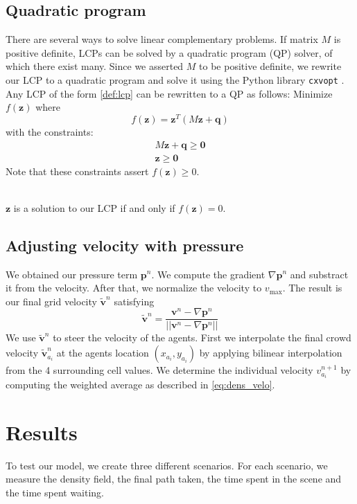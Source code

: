 \documentclass{article}
\let\oldtil\tilde
\renewcommand{\vec}[1]{\mathbf{#1}}
\renewcommand{\tilde}[1]{\oldtil{\mathbf{#1}}}
\begin{document}
\subsection{Quadratic program}
There are several ways to solve linear complementary problems. If  matrix $M$ is positive definite, LCPs can be solved by a quadratic program (QP) solver, of which there exist many. Since we asserted $M$ to be positive definite, we rewrite our LCP to a quadratic program and solve it using the Python library \texttt{cxvopt} \cite{cvxopt}.
\ \\
Any LCP of the form \eqref{def:lcp} can be rewritten to a QP as follows: Minimize $f(\vec{z})$ where
\begin{equation}
	f(\vec{z}) = \vec{z}^T\left( M\vec{z}+\vec{q} \right)
\end{equation}
with the constraints:
\begin{align}
	M\vec{z} + \vec{q}\geq\vec{0}\\
	\vec{z}\geq\vec{0}
\end{align}
Note that these constraints assert $f(\vec{z}) \geq 0$. 

\ \\
$\vec{z}$ is a solution to our LCP if and only if $f(\vec{z})=0$. 
\subsection{Adjusting velocity with pressure}
We obtained our pressure term $\vec{p}^n$. We compute the gradient $\nabla\vec{p}^n$ and substract it from the velocity. After that, we normalize the velocity to $v_{\max}$.
The result is our final grid velocity $\tilde{v}^n$ satisfying
\begin{equation}
	\tilde{v}^n = \frac{\vec{v}^n-\nabla\vec{p}^n}{||\vec{v}^n-\nabla\vec{p}^n||}
	\label{eq:finvelocity}
\end{equation}
We use $\tilde{v}^n$ to steer the velocity of the agents. First we interpolate the final crowd velocity $\tilde{v}^n_{a_i}$ at the agents location $(x_{a_i},y_{a_i})$ by applying bilinear interpolation from the 4 surrounding cell values. We determine the individual velocity $v^{n+1}_{a_i}$ by computing the weighted average as described in \eqref{eq:dens_velo}.
\newpage
\section{Results}
To test our model, we create three different scenarios. For each scenario, we measure the density field, the final path taken, the time spent in the scene and the time spent waiting.
\end{document}
